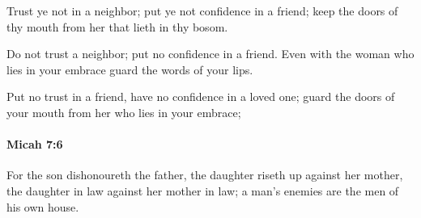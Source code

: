			\begin{versebox}
					\item[BHS] 
					\item[LXX] 
					\item[ASV] Trust ye not in a neighbor; put ye not confidence in a friend; keep the doors of thy mouth from her that lieth in thy bosom.
					\item[NIV] Do not trust a neighbor; put no confidence in a friend. Even with the woman who lies in your embrace guard the words of your lips.
					\item[NRSV] Put no trust in a friend, have no confidence in a loved one; guard the doors of your mouth from her who lies in your embrace;
			\end{versebox}

		\paragraph{Micah 7:6} %
			\label{MICAH-7-6}

			For the son dishonoureth the father, the daughter riseth up against her mother, the daughter in law against her mother in law; a man's enemies are the men of his own house.

